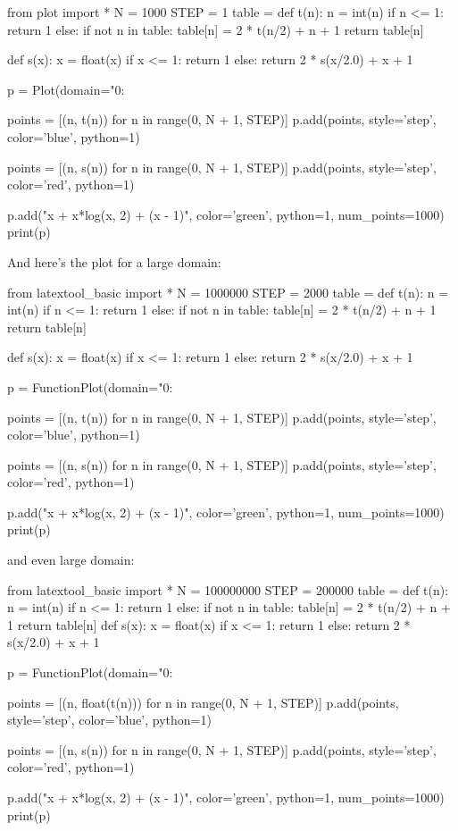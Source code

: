 \begin{python}
from plot import *
N = 1000
STEP = 1
table = {}
def t(n):
    n = int(n)
    if n <= 1: return 1
    else:
        if not n in table:
            table[n] = 2 * t(n/2) + n + 1
        return table[n]

def s(x):
    x = float(x)
    if x <= 1: return 1
    else:
        return 2 * s(x/2.0) + x + 1

p = Plot(domain="0:%

points = [(n, t(n)) for n in range(0, N + 1, STEP)]
p.add(points, style='step', color='blue', python=1)

points = [(n, s(n)) for n in range(0, N + 1, STEP)]
p.add(points, style='step', color='red', python=1)

p.add("x + x*log(x, 2) + (x - 1)", color='green', python=1, num_points=1000)
print(p)
\end{python}

And here's the plot for a large domain:
\begin{python}
from latextool_basic import *
N = 1000000
STEP = 2000
table = {}
def t(n):
    n = int(n)
    if n <= 1: return 1
    else:
        if not n in table:
            table[n] = 2 * t(n/2) + n + 1
        return table[n]

def s(x):
    x = float(x)
    if x <= 1: return 1
    else:
        return 2 * s(x/2.0) + x + 1

p = FunctionPlot(domain="0:%

points = [(n, t(n)) for n in range(0, N + 1, STEP)]
p.add(points, style='step', color='blue', python=1)

points = [(n, s(n)) for n in range(0, N + 1, STEP)]
p.add(points, style='step', color='red', python=1)

p.add("x + x*log(x, 2) + (x - 1)", color='green', python=1, num_points=1000)
print(p)
\end{python}
and even large domain:
\begin{python}
from latextool_basic import *
N = 100000000
STEP = 200000
table = {}
def t(n):
    n = int(n)
    if n <= 1: return 1
    else:
        if not n in table:
            table[n] = 2 * t(n/2) + n + 1
        return table[n]
def s(x):
    x = float(x)
    if x <= 1: return 1
    else:
        return 2 * s(x/2.0) + x + 1

p = FunctionPlot(domain="0:%

points = [(n, float(t(n))) for n in range(0, N + 1, STEP)]
p.add(points, style='step', color='blue', python=1)

points = [(n, s(n)) for n in range(0, N + 1, STEP)]
p.add(points, style='step', color='red', python=1)

p.add("x + x*log(x, 2) + (x - 1)", color='green', python=1, num_points=1000)
print(p)
\end{python}

